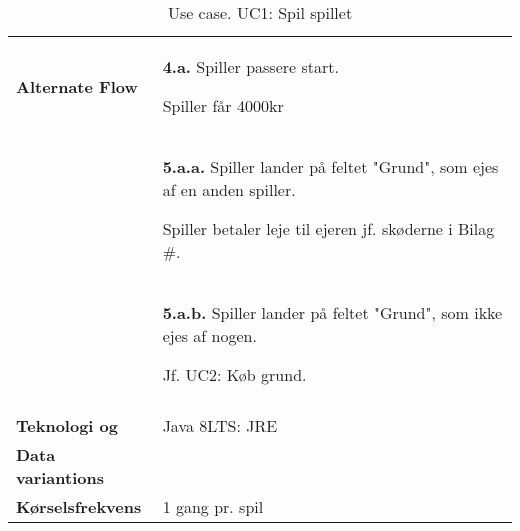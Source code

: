 \documentclass[class=article, crop=false]{standalone}
\begin{document}
\begin{table}[H]
\begin{tabularx}{\textwidth}{|l|X|}
            \textbf{Alternate Flow}   & \textbf{4.a.} Spiller passere start.
                                        \begin{enumerate} \begin{tabenum}
                                                \item Spiller får 4000kr
                                            \end{tabenum} \end{enumerate}
                                         \\
                                      & \textbf{5.a.a.} Spiller lander på feltet
                                        "Grund", som ejes af en anden spiller.
                                        \begin{enumerate} \begin{tabenum}
                                          \item Spiller betaler leje til ejeren
                                                jf. skøderne i Bilag \#.
                                        \end{tabenum} \end{enumerate}
                                        \\
                                    & \textbf{5.a.b.} Spiller lander på feltet
                                        "Grund", som ikke ejes af nogen.
                                    \begin{enumerate} \begin{tabenum}
                                                          \item Jf. UC2: Køb grund.
                                    \end{tabenum} \end{enumerate}
                                    \\


                                        \\



            \hline








            \textbf{Teknologi og}     & Java 8LTS: JRE \\
            \textbf{Data variantions} &  \\ \hline
            \textbf{Kørselsfrekvens} & 1 gang pr. spil\\ \hline
        \end{tabularx}
        \caption{Use case. UC1: Spil spillet}

    \end{table}
\end{document}
